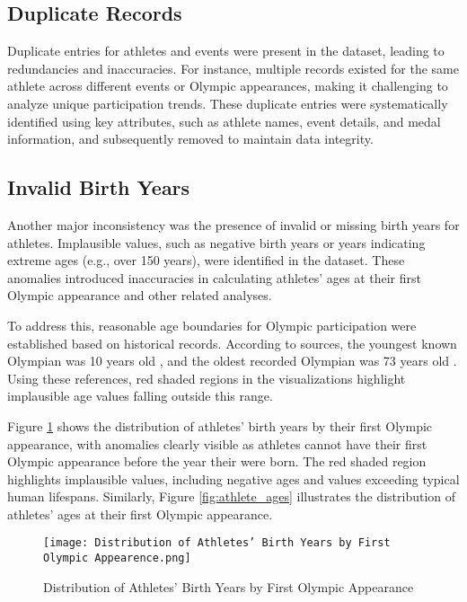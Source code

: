 \subsection{Duplicate Records}

Duplicate entries for athletes and events were present in the dataset, leading to redundancies and inaccuracies. For instance, multiple records existed for the same athlete across different events or Olympic appearances, making it challenging to analyze unique participation trends. These duplicate entries were systematically identified using key attributes, such as athlete names, event details, and medal information, and subsequently removed to maintain data integrity.

\subsection{Invalid Birth Years}

Another major inconsistency was the presence of invalid or missing birth years for athletes. Implausible values, such as negative birth years or years indicating extreme ages (e.g., over 150 years), were identified in the dataset. These anomalies introduced inaccuracies in calculating athletes' ages at their first Olympic appearance and other related analyses.

To address this, reasonable age boundaries for Olympic participation were established based on historical records. According to sources, the youngest known Olympian was 10 years old \cite{youngest_olympian}, and the oldest recorded Olympian was 73 years old \cite{oldest_olympian}. Using these references, red shaded regions in the visualizations highlight implausible age values falling outside this range.

Figure \ref{fig:birth_years} shows the distribution of athletes' birth years by their first Olympic appearance, with anomalies clearly visible as athletes cannot have their first Olympic appearance before the year their were born. The red shaded region highlights implausible values, including negative ages and values exceeding typical human lifespans. Similarly, Figure \ref{fig:athlete_ages} illustrates the distribution of athletes' ages at their first Olympic appearance.

\begin{figure}[ht]
    \centering
    \texttt{[image: Distribution of Athletes' Birth Years by First Olympic Appearence.png]}
    \caption{Distribution of Athletes' Birth Years by First Olympic Appearance}
    \label{fig:birth_years}
\end{figure}

